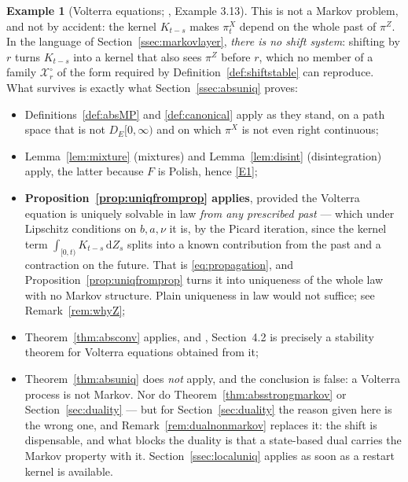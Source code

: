 \documentclass[11pt,a4paper]{article}
\theoremstyle{plain}
\theoremstyle{definition}
\newtheorem{example}[theorem]{Example}
\theoremstyle{remark}
\newcommand{\DE}{D_E[0,\infty)}
\newcommand{\XX}{\mathcal{X}}                  %
\newcommand{\dif}{\,\mathrm{d}}
\newcommand{\CPS}{\cite{CPS23}}
\begin{document}
\begin{example}[Volterra equations; \CPS, Example 3.13]
  This is not a Markov problem, and not by accident: the kernel $K_{t-s}$ makes
  $\pi^X_t$ depend on the whole past of $\pi^Z$.  In the language of
  Section~\ref{ssec:markovlayer}, \emph{there is no shift system}: shifting by $r$
  turns $K_{t-s}$ into a kernel that also sees $\pi^Z$ before $r$, which no
  member of a family $\XX^\circ_r$ of the form required by
  Definition~\ref{def:shiftstable} can reproduce.  What survives is exactly what
  Section~\ref{ssec:absuniq} proves:
  \begin{itemize}
  \item Definitions~\ref{def:absMP} and \ref{def:canonical} apply as they stand,
    on a path space that is not $\DE$ and on which $\pi^X$ is not even right
    continuous;
  \item Lemma~\ref{lem:mixture} (mixtures) and Lemma~\ref{lem:disint}
    (disintegration) apply, the latter because $F$ is Polish, hence \eqref{E1};
  \item \textbf{Proposition~\ref{prop:uniqfromprop} applies}, provided the
    Volterra equation is uniquely solvable in law \emph{from any prescribed past}
    --- which under Lipschitz conditions on $b,a,\nu$ it is, by the Picard
    iteration, since the kernel term $\int_{[0,t)}K_{t-s}\dif Z_s$ splits into a
    known contribution from the past and a contraction on the future.  That is
    \eqref{eq:propagation}, and Proposition~\ref{prop:uniqfromprop} turns it into
    uniqueness of the whole law with no Markov structure.  Plain uniqueness in law
    would not suffice; see Remark~\ref{rem:whyZ};
  \item Theorem~\ref{thm:absconv} applies, and \CPS, Section~4.2 is precisely a
    stability theorem for Volterra equations obtained from it;
  \item Theorem~\ref{thm:absuniq} does \emph{not} apply, and the conclusion is
    false: a Volterra process is not Markov.  Nor do
    Theorem~\ref{thm:absstrongmarkov} or Section~\ref{sec:duality} --- but for
    Section~\ref{sec:duality} the reason given here is the wrong one, and
    Remark~\ref{rem:dualnonmarkov} replaces it: the shift is dispensable, and what
    blocks the duality is that a state-based dual carries the Markov property
    with it.  Section~\ref{ssec:localuniq} applies as soon as a restart
    kernel is available.
  \end{itemize}
\end{example}
\end{document}
